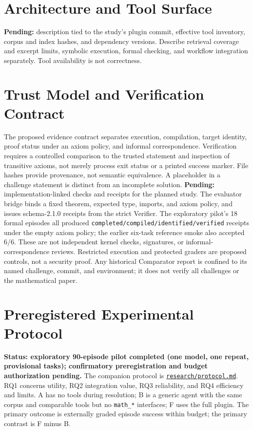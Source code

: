 \documentclass{article}
\begin{document}
\section{Architecture and Tool Surface}
\textbf{Pending:} description tied to the study's plugin commit, effective
tool inventory, corpus and index hashes, and dependency versions. Describe
retrieval coverage and excerpt limits, symbolic execution, formal checking,
and workflow integration separately. Tool availability is not correctness.

\section{Trust Model and Verification Contract}
The proposed evidence contract separates execution, compilation, target
identity, proof status under an axiom policy, and informal correspondence.
Verification requires a controlled comparison to the trusted statement and
inspection of transitive axioms, not merely process exit status or a printed
success marker. File hashes provide provenance, not semantic equivalence.
A placeholder in a challenge statement is distinct from an incomplete solution.
\textbf{Pending:} implementation-linked checks and receipts for the planned
study. The evaluator bridge binds a fixed theorem, expected type, imports, and
axiom policy, and issues schema-2.1.0 receipts from the strict Verifier. The
exploratory pilot's 18 formal episodes all produced
\texttt{completed/compiled/identified/verified} receipts under the empty axiom
policy; the earlier six-task reference smoke also accepted 6/6. These are not
independent kernel checks, signatures, or informal-correspondence reviews.
Restricted execution and protected graders are proposed controls, not a
security proof.
Any historical Comparator report is confined to its named challenge,
commit, and environment; it does not verify all challenges or the mathematical paper.

\section{Preregistered Experimental Protocol}
\textbf{Status: exploratory 90-episode pilot completed (one model, one repeat,
provisional tasks); confirmatory preregistration and budget authorization
pending.}
The companion protocol is
\href{../research/protocol.md}{\texttt{research/protocol.md}}.
RQ1 concerns utility, RQ2 integration value, RQ3 reliability, and RQ4
efficiency and limits. A has no tools during resolution; B is a generic agent
with the same corpus and comparable tools but no \texttt{math\_*} interfaces;
F uses the full plugin. The primary outcome is externally graded episode
success within budget; the primary contrast is F minus B.
\end{document}
